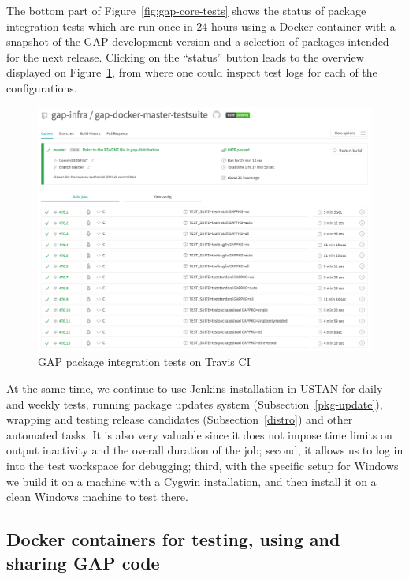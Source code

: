 The bottom part of Figure~\ref{fig:gap-core-tests} shows the status 
of package integration tests
which are run once in 24 hours using a Docker container with
a snapshot of the GAP development version
and a selection of \GAP packages intended for the next release. 
Clicking on the ``status'' button leads to the overview displayed
on Figure~\ref{fig:gap-docker-master-testsuite}, from where one could inspect
test logs for each of the configurations. 

\begin{figure}[!ht]
    \centering
    \includegraphics[width=\textwidth]{images/gap-docker-master-testsuite}
    \caption{GAP package integration tests on Travis CI}
    \label{fig:gap-docker-master-testsuite}
\end{figure}

At the same time, we continue to use Jenkins installation in USTAN 
for daily and weekly tests, running package updates system (Subsection~\ref{pkg-update}), wrapping and
testing release candidates (Subsection~\ref{distro}) and other automated tasks. It is also very valuable since 
it does not impose time limits on output inactivity and the overall duration
of the job; second, it allows us to log in into the test workspace for
debugging; third, with the specific \GAP setup for Windows we build it on a
machine with a Cygwin installation, and then install it on a clean Windows
machine to test there. 

\subsection{Docker containers for testing, using and sharing GAP code}

